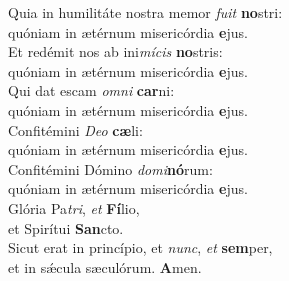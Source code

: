 \evenverse Quia in humilitáte nostra memor \textit{fu}\textit{it} \textbf{no}stri:~\*\\
\evenverse quóniam in ætérnum misericórdia \textbf{e}jus.\\
\oddverse Et redémit nos ab ini\textit{mí}\textit{cis} \textbf{no}stris:~\*\\
\oddverse quóniam in ætérnum misericórdia \textbf{e}jus.\\
\evenverse Qui dat escam \textit{om}\textit{ni} \textbf{car}ni:~\*\\
\evenverse quóniam in ætérnum misericórdia \textbf{e}jus.\\
\oddverse Confitémini \textit{De}\textit{o} \textbf{cæ}li:~\*\\
\oddverse quóniam in ætérnum misericórdia \textbf{e}jus.\\
\evenverse Confitémini Dómino \textit{do}\textit{mi}\textbf{nó}rum:~\*\\
\evenverse quóniam in ætérnum misericórdia \textbf{e}jus.\\
\oddverse Glória Pa\textit{tri}, \textit{et} \textbf{Fí}lio,~\*\\
\oddverse et Spirítui \textbf{San}cto.\\
\evenverse Sicut erat in princípio, et \textit{nunc}, \textit{et} \textbf{sem}per,~\*\\
\evenverse et in sǽcula sæculórum. \textbf{A}men.\\
